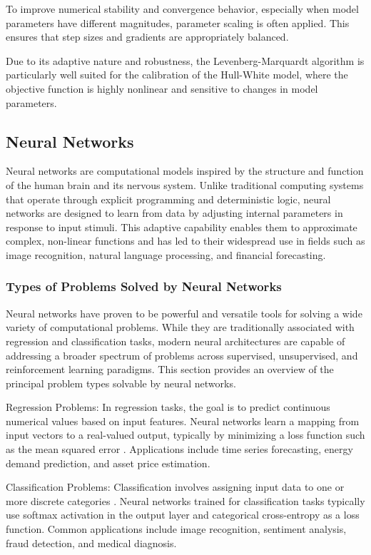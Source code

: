To improve numerical stability and convergence behavior, especially when model parameters have different magnitudes, parameter scaling is often applied. This ensures that step sizes and gradients are appropriately balanced.

Due to its adaptive nature and robustness, the Levenberg-Marquardt algorithm is particularly well suited for the calibration of the Hull-White model, where the objective function is highly nonlinear and sensitive to changes in model parameters.

\subsection{Neural Networks}
Neural networks are computational models inspired by the structure and function of the human brain and its nervous system. Unlike traditional computing systems that operate through explicit programming and deterministic logic, neural networks are designed to learn from data by adjusting internal parameters in response to input stimuli. This adaptive capability enables them to approximate complex, non-linear functions and has led to their widespread use in fields such as image recognition, natural language processing, and financial forecasting.

\subsubsection{Types of Problems Solved by Neural Networks}
Neural networks have proven to be powerful and versatile tools for solving a wide variety of computational problems. While they are traditionally associated with regression and classification tasks, modern neural architectures are capable of addressing a broader spectrum of problems across supervised, unsupervised, and reinforcement learning paradigms. This section provides an overview of the principal problem types solvable by neural networks.

Regression Problems: In regression tasks, the goal is to predict continuous numerical values based on input features. Neural networks learn a mapping from input vectors to a real-valued output, typically by minimizing a loss function such as the mean squared error \parencite[p.~99]{goodfellow2016deeplearning}. Applications include time series forecasting, energy demand prediction, and asset price estimation.

Classification Problems: Classification involves assigning input data to one or more discrete categories \parencite[p.~98]{goodfellow2016deeplearning}. Neural networks trained for classification tasks typically use softmax activation in the output layer and categorical cross-entropy as a loss function. Common applications include image recognition, sentiment analysis, fraud detection, and medical diagnosis.

